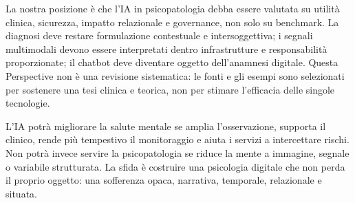 \documentclass[utf8]{FrontiersinHarvard}
\begin{document}
La nostra posizione \`e che l'\ac{IA} in psicopatologia debba essere valutata su utilit\`a clinica, sicurezza, impatto relazionale e governance, non solo su benchmark. La diagnosi deve restare formulazione contestuale e intersoggettiva; i segnali multimodali devono essere interpretati dentro infrastrutture e responsabilit\`a proporzionate; il chatbot deve diventare oggetto dell'anamnesi digitale. Questa Perspective non \`e una revisione sistematica: le fonti e gli esempi sono selezionati per sostenere una tesi clinica e teorica, non per stimare l'efficacia delle singole tecnologie.

L'\ac{IA} potr\`a migliorare la salute mentale se amplia l'osservazione, supporta il clinico, rende pi\`u tempestivo il monitoraggio e aiuta i servizi a intercettare rischi. Non potr\`a invece servire la psicopatologia se riduce la mente a immagine, segnale o variabile strutturata. La sfida \`e costruire una psicologia digitale che non perda il proprio oggetto: una sofferenza opaca, narrativa, temporale, relazionale e situata.

{\small


}
\end{document}
